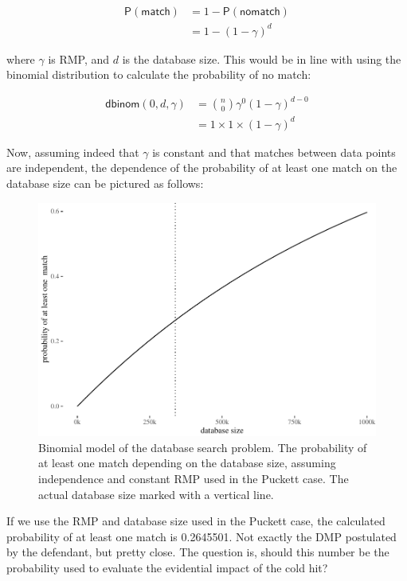 \documentclass[10pt,dvipsnames,enabledeprecatedfontcommands]{scrartcl}
\newcommand{\pr}[1]{\mathsf{P}(#1)}
\begin{document}
\begin{align*}
\pr{\mathsf{match}} & = 1 - \pr{\mathsf{no match}}\\
& = 1 - (1-\gamma)^d
\end{align*}

\noindent where \(\gamma\) is RMP, and \(d\) is the database size. This
would be in line with using the binomial distribution to calculate the
probability of no match:

\begin{align*}
\mathsf{dbinom}(0,d,\gamma) & = {n \choose 0} \gamma^0 (1-\gamma)^{d-0}\\
& = 1 \times 1 \times (1-\gamma)^d
\end{align*}

Now, assuming indeed that \(\gamma\) is constant and that matches
between data points are independent, the dependence of the probability
of at least one match on the database size can be pictured as follows:

\begin{figure}

{\centering \includegraphics[width=0.8\linewidth]{lr-chapter2_files/figure-latex/unnamed-chunk-4-1} 

}

\caption{Binomial model of the database search problem. The probability of at least one match depending on the database size, assuming independence and constant RMP used in  the Puckett case. The actual database size marked with a vertical line.}\label{fig:unnamed-chunk-4}
\end{figure}

If we use the RMP and database size used in the Puckett case, the
calculated probability of at least one match is 0.2645501. Not exactly
the DMP postulated by the defendant, but pretty close. The question is,
should this number be the probability used to evaluate the evidential
impact of the cold hit?
\end{document}
